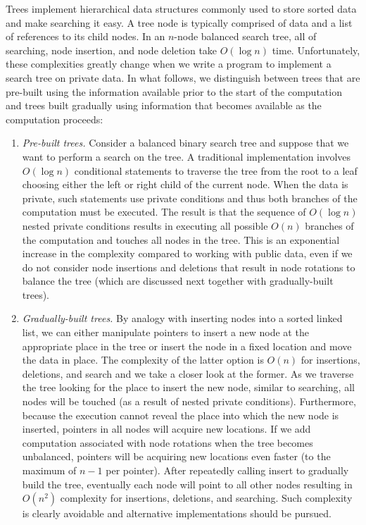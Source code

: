\documentclass[11pt]{article}
\begin{document}
Trees implement hierarchical data structures commonly used to store sorted
data and make searching it easy. A tree node is typically comprised of data
and a list of references to its child nodes. In an $n$-node balanced search
tree, all of searching, node insertion, and node deletion take $O(\log n)$
time. Unfortunately, these complexities greatly change when we write a
program to implement a search tree on private data. In what follows, we
distinguish between trees that are pre-built using the information
available prior to the start of the computation and trees built gradually
using information that becomes available as the computation proceeds: 
\begin{enumerate}
\item \emph{Pre-built trees.} Consider a balanced binary search tree and
  suppose that we want to perform a search on the tree. A traditional
  implementation involves $O(\log n)$ conditional statements to traverse the
  tree from the root to a leaf choosing either the left or right child of
  the current node. When the data is private, such statements use private
  conditions and thus both branches of the computation must be executed. The
  result is that the sequence of $O(\log n)$ nested private conditions
  results in executing all possible $O(n)$ branches of the computation and
  touches all nodes in the tree. This is an exponential increase in the
  complexity compared to working with public data, even if we do not consider
  node insertions and deletions that result in node rotations to balance the
  tree (which are discussed next together with gradually-built trees). 

\item \emph{\it Gradually-built trees.} By analogy with inserting nodes into
  a sorted linked list, we can either manipulate pointers to insert a new
  node at the appropriate place in the tree or insert the node in a fixed
  location and move the data in place. The complexity of the latter option
  is $O(n)$ for insertions, deletions, and search and we take a closer look
  at the former. As we traverse the tree looking for the place to insert the
  new node, similar to searching, all nodes will be touched (as a result of
  nested private conditions). Furthermore, because the execution cannot
  reveal the place into which the new node is inserted, pointers in all
  nodes will acquire new locations. If we add computation associated with
  node rotations when the tree becomes unbalanced, pointers will be
  acquiring new locations even faster (to the maximum of $n-1$ per pointer).
  After repeatedly calling insert to gradually build the tree, eventually
  each node will point to all other nodes resulting in $O(n^2)$ complexity
  for insertions, deletions, and searching. Such complexity is clearly
  avoidable and alternative implementations should be pursued.
\end{enumerate}
\end{document}
